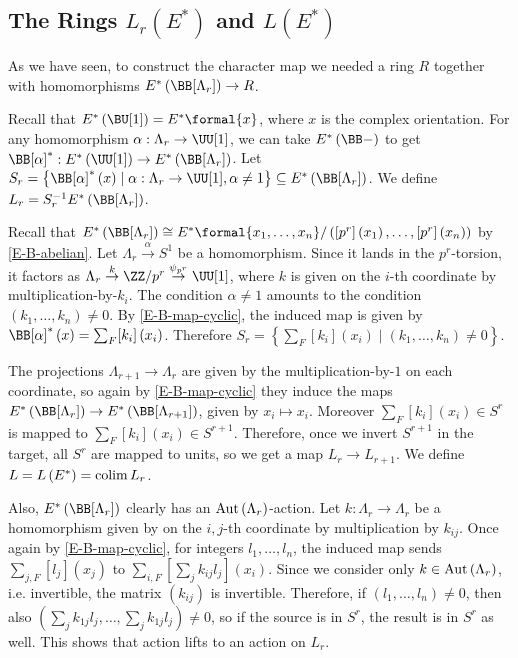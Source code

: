 \subsection{The Rings \texorpdfstring{$L_r\left(E^*\right)$}{Lr(E*)} and \texorpdfstring{$L\left(E^*\right)$}{L(E*)}}

As we have seen, to construct the character map we needed a ring $R$ together with homomorphisms $E^*\left(\BB[\Lambda_r]\right) \to R$.

Recall that $E^*\left(\BU[1]\right) = E^*\formal{x}$, where $x$ is the complex orientation.
For any homomorphism $\alpha: \Lambda_r \to \UU[1]$, we can take $E^*\left(\BB-\right)$ to get $\BB[\alpha]^*: E^*\left(\UU[1]\right) \to E^*\left(\BB[\Lambda_r]\right)$.
Let $S_r = \left\{ \BB[\alpha]^*\left(x\right) \mid \alpha: \Lambda_r \to \UU[1], \alpha \neq 1 \right\} \subseteq E^*\left(\BB[\Lambda_r]\right)$.
We define $L_r = S_r^{-1} E^*\left(\BB[\Lambda_r]\right)$.

Recall that $E^*\left(\BB[\Lambda_r]\right) \cong E^*\formal{x_1, \dotsc, x_n}/\left(\left[p^r\right]\left(x_1\right), \dotsc, \left[p^r\right]\left(x_n\right)\right)$ by \ref{E-B-abelian}.
Let $\Lambda_r \overset{\alpha}{\to} S^1$ be a homomorphism.
Since it lands in the $p^r$-torsion, it factors as $\Lambda_r \overset{k}{\to} \ZZ/{p^r} \overset{\psi_{p^r}}{\to} \UU[1]$, where $k$ is given on the $i$-th coordinate by multiplication-by-$k_i$.
The condition $\alpha \neq 1$ amounts to the condition $\left(k_1, \dotsc, k_n\right) \neq 0$.
By \ref{E-B-map-cyclic}, the induced map is given by $\BB[\alpha]^*\left(x\right) = \sum_F [k_i]\left(x_i\right)$.
Therefore $S_r = \left\{ \sum_F [k_i]\left(x_i\right) \mid \left(k_1, \dotsc, k_n\right) \neq 0\right\}$.

The projections $\Lambda_{r+1} \to \Lambda_r$ are given by the multiplication-by-$1$ on each coordinate, so again by \ref{E-B-map-cyclic} they induce the maps $E^*\left(\BB[\Lambda_r]\right) \to E^*\left(\BB[\Lambda_{r+1}]\right)$, given by $x_i \mapsto x_i$.
Moreover $\sum_F [k_i]\left(x_i\right) \in S^r$ is mapped to $\sum_F [k_i]\left(x_i\right) \in S^{r+1}$.
Therefore, once we invert $S^{r+1}$ in the target, all $S^r$ are mapped to units, so we get a map $L_r \to L_{r+1}$.
We define $L = L\left(E^*\right) = \operatorname{colim} L_r$.

Also, $E^*\left(\BB[\Lambda_r]\right)$ clearly has an $\operatorname{Aut}\left(\Lambda_r\right)$-action.
Let $k: \Lambda_r \to \Lambda_r$ be a homomorphism given by on the $i,j$-th coordinate by multiplication by $k_{ij}$.
Once again by \ref{E-B-map-cyclic}, for integers $l_1, \dotsc, l_n$, the induced map sends $\sum_{j,F} [l_j]\left(x_j\right)$ to $\sum_{i,F}\left[\sum_j k_{ij} l_j\right]\left(x_i\right)$.
Since we consider only $k \in \operatorname{Aut}\left(\Lambda_r\right)$, i.e. invertible, the matrix $\left(k_{ij}\right)$ is invertible.
Therefore, if $\left(l_1, \dotsc, l_n\right) \neq 0$, then also $\left(\sum_j k_{1j} l_j, \dotsc, \sum_j k_{1j} l_j\right) \neq 0$, so if the source is in $S^r$, the result is in $S^r$ as well.
This shows that action lifts to an action on $L_r$.

